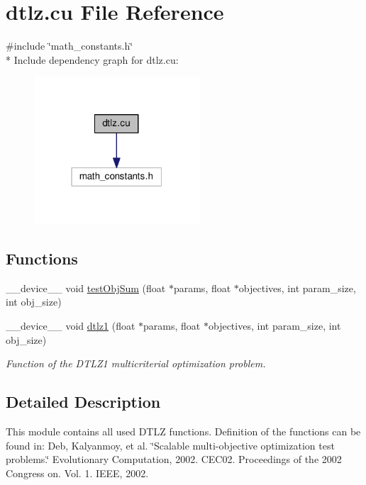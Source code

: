 \hypertarget{dtlz_8cu}{}\section{dtlz.\+cu File Reference}
\label{dtlz_8cu}
{\ttfamily \#include \char`\"{}math\+\_\+constants.\+h\char`\"{}}\\*
Include dependency graph for dtlz.\+cu\+:
\nopagebreak
\begin{figure}[H]
\begin{center}
\leavevmode
\includegraphics[width=175pt]{dtlz_8cu__incl}
\end{center}
\end{figure}
\subsection*{Functions}
\begin{DoxyCompactItemize}
\item 
\+\_\+\+\_\+device\+\_\+\+\_\+ void \hyperlink{dtlz_8cu_af665aa59f6d550787a3da256e11ca075}{test\+Obj\+Sum} (float $\ast$params, float $\ast$objectives, int param\+\_\+size, int obj\+\_\+size)
\item 
\+\_\+\+\_\+device\+\_\+\+\_\+ void \hyperlink{dtlz_8cu_acb7db8f8aa7dde56b645cf50934148e4}{dtlz1} (float $\ast$params, float $\ast$objectives, int param\+\_\+size, int obj\+\_\+size)
\begin{DoxyCompactList}\small\item\em Function of the D\+T\+L\+Z1 multicriterial optimization problem. \end{DoxyCompactList}\end{DoxyCompactItemize}


\subsection{Detailed Description}
This module contains all used D\+T\+LZ functions. Definition of the functions can be found in\+: Deb, Kalyanmoy, et al. \char`\"{}\+Scalable multi-\/objective optimization test problems.\char`\"{} Evolutionary Computation, 2002. C\+EC\textquotesingle{}02. Proceedings of the 2002 Congress on. Vol. 1. I\+E\+EE, 2002. 

